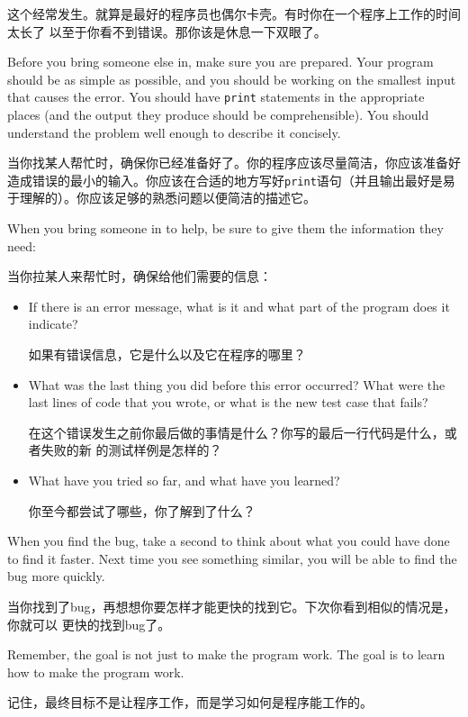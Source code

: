 \documentclass[10pt]{book}
\begin{document}
\begin{CJK}{UTF8}{gbsn}
这个经常发生。就算是最好的程序员也偶尔卡壳。有时你在一个程序上工作的时间太长了
以至于你看不到错误。那你该是休息一下双眼了。

Before you bring someone else in, make sure you are prepared.
Your program should be as simple
as possible, and you should be working on the smallest input
that causes the error.  You should have {\tt print} statements in the
appropriate places (and the output they produce should be
comprehensible).  You should understand the problem well enough
to describe it concisely.

当你找某人帮忙时，确保你已经准备好了。你的程序应该尽量简洁，你应该准备好造成错误的最小的输入。你应该在合适的地方写好{\tt print}语句（并且输出最好是易于理解的）。你应该足够的熟悉问题以便简洁的描述它。

When you bring someone in to help, be sure to give
them the information they need:

当你拉某人来帮忙时，确保给他们需要的信息：

\begin{itemize}

\item If there is an error message, what is it
and what part of the program does it indicate?

如果有错误信息，它是什么以及它在程序的哪里？

\item What was the last thing you did before this error occurred?
What were the last lines of code that you wrote, or what is
the new test case that fails?

在这个错误发生之前你最后做的事情是什么？你写的最后一行代码是什么，或者失败的新
的测试样例是怎样的？

\item What have you tried so far, and what have you learned?

    你至今都尝试了哪些，你了解到了什么？

\end{itemize}

When you find the bug, take a second to think about what you
could have done to find it faster.  Next time you see something
similar, you will be able to find the bug more quickly.

当你找到了bug，再想想你要怎样才能更快的找到它。下次你看到相似的情况是，你就可以
更快的找到bug了。

Remember, the goal is not just to make the program
work.  The goal is to learn how to make the program work.

记住，最终目标不是让程序工作，而是学习如何是程序能工作的。



\end{CJK}
\end{document}

